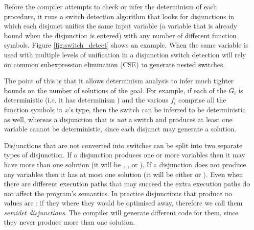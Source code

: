 Before the compiler attempts to check or infer
the determinism of each procedure,
it runs a switch detection algorithm that looks for disjunctions
in which each disjunct unifies the same input variable
(a variable that is already bound when the disjunction is entered)
with any number of different function symbols.
Figure \ref{fig:switch_detect} shows an example.
When the same variable is used with multiple levels of unification in a
disjunction switch detection will rely on
common subexpression elimination (CSE)
to generate nested switches.

The point of this is that it allows determinism analysis
to infer much tighter bounds on the number of solutions of the goal.
For example, if each of the $G_i$ is deterministic
(i.e. it has determinism )
and the various $f_i$ comprise all the function symbols in $x$'s type,
then the switch can be inferred to be deterministic as well,
whereas a disjunction that is \emph{not} a switch and produces at least one
variable
cannot be deterministic,
since each disjunct may generate a solution.

Disjunctions that are not converted into switches can be split into two
separate types of disjunction.
If a disjunction produces one or more variables
then it may have more than one solution
(it will be \dnondet, \dmulti, \dccnondet or \dccmulti).
If a disjunction does not produce any variables
then it has at most one solution
(it will be either \dsemidet or \ddet).
Even when there are different execution paths that may succeed
the extra execution paths do not affect the program's semantics.
In practice disjunctions that produce no values are \dsemidet:
if they where \ddet they would be optimised away,
therefore we call them \emph{semidet disjunctions}.
The compiler will generate different code for them,
since they never produce more than one solution.

